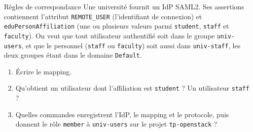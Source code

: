\begin{exercice}{Règles de correspondance}\label{ex:ks-mapping}
Une université fournit un IdP SAML2. Ses assertions contiennent l'attribut \texttt{REMOTE\_USER} (l'identifiant de connexion) et
\texttt{eduPersonAffiliation} (une ou plusieurs valeurs parmi \texttt{student}, \texttt{staff} et \texttt{faculty}). On veut que tout
utilisateur authentifié soit dans le groupe \texttt{univ-users}, et que le personnel (\texttt{staff} ou \texttt{faculty}) soit aussi
dans \texttt{univ-staff}, les deux groupes étant dans le domaine \texttt{Default}.
\begin{enumerate}[label=\arabic*.,nosep]
  \item Écrire le mapping.
  \item Qu'obtient un utilisateur dont l'affiliation est \texttt{student} ? Un utilisateur \texttt{staff} ?
  \item Quelles commandes enregistrent l'IdP, le mapping et le protocole, puis donnent le rôle \texttt{member} à \texttt{univ-users} sur
        le projet \texttt{tp-openstack} ?
\end{enumerate}
\end{exercice}
